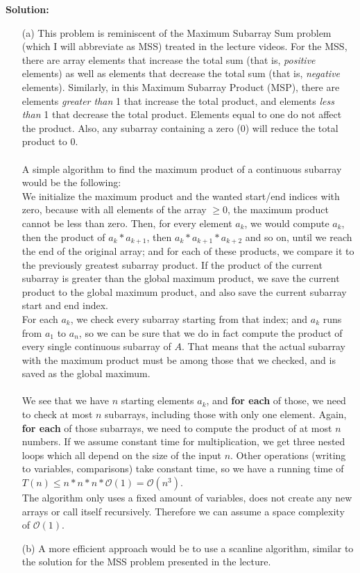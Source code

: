 \documentclass[9pt]{article}
\begin{document}
\textbf{Solution:}
\begin{enumerate}
    \item[(a)] This problem is reminiscent of the Maximum Subarray Sum problem (which I will abbreviate as MSS) treated in the lecture videos. For the MSS, there are array elements that increase the total sum (that is, \emph{positive} elements) as well as elements that decrease the total sum (that is, \emph{negative} elements). Similarly, in this Maximum Subarray Product (MSP), there are elements \emph{greater than} 1 that increase the total product, and elements \emph{less than} 1 that decrease the total product. Elements equal to one do not affect the product. Also, any subarray containing a zero (0) will reduce the total product to 0.\\
    \\
    A simple algorithm to find the maximum product of a continuous subarray would be the following:\\
    We initialize the maximum product and the wanted start/end indices with zero, because with all elements of the array $\geq0$, the maximum product cannot be less than zero. Then, for every element $a_k$, we would compute $a_k$, then the product of $a_k * a_{k+1}$, then $a_k * a_{k+1} * a_{k+2}$ and so on, until we reach the end of the original array; and for each of these products, we compare it to the previously greatest subarray product. If the product of the current subarray is greater than the global maximum product, we save the current product to the global maximum product, and also save the current subarray start and end index.\\
    For each $a_k$, we check every subarray starting from that index; and $a_k$ runs from $a_1$ to $a_n$, so  we can be sure that we do in fact compute the product of every single continuous subarray of $A$. That means that the actual subarray with the maximum product must be among those that we checked, and is saved as the global maximum.\\
    \\
    We see that we have $n$ starting elements $a_k$, and \textbf{for each} of those, we need to check at most $n$ subarrays, including those with only one element. Again, \textbf{for each} of those subarrays, we need to compute the product of at most $n$ numbers. If we assume constant time for multiplication, we get three nested loops which all depend on the size of the input $n$. Other operations (writing to variables, comparisons) take constant time, so we have a running time of $T(n)\leq n*n*n*\mathcal{O}(1)=\mathcal{O}(n^3)$.\\
    The algorithm only uses a fixed amount of variables, does not create any new arrays or call itself recursively. Therefore we can assume a space complexity of $\mathcal{O}(1)$.
    \item[(b)] A more efficient approach would be to use a scanline algorithm, similar to the solution for the MSS problem presented in the lecture.


\end{enumerate}
\end{document}
